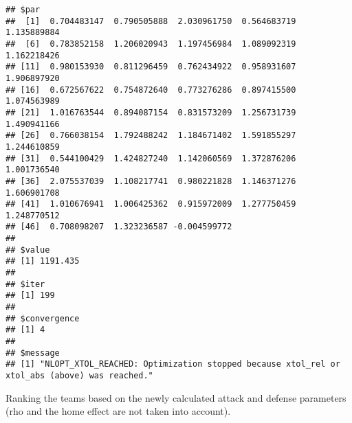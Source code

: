 \documentclass[
]{article}
\newenvironment{Shaded}{\begin{snugshade}}{\end{snugshade}}
\newcommand{\AttributeTok}[1]{\textcolor[rgb]{0.77,0.63,0.00}{#1}}
\newcommand{\DecValTok}[1]{\textcolor[rgb]{0.00,0.00,0.81}{#1}}
\newcommand{\FunctionTok}[1]{\textcolor[rgb]{0.00,0.00,0.00}{#1}}
\newcommand{\NormalTok}[1]{#1}
\newcommand{\OtherTok}[1]{\textcolor[rgb]{0.56,0.35,0.01}{#1}}
\newcommand{\SpecialCharTok}[1]{\textcolor[rgb]{0.00,0.00,0.00}{#1}}
\newcommand{\StringTok}[1]{\textcolor[rgb]{0.31,0.60,0.02}{#1}}
\begin{document}
\begin{verbatim}
## $par
##  [1]  0.704483147  0.790505888  2.030961750  0.564683719  1.135889884
##  [6]  0.783852158  1.206020943  1.197456984  1.089092319  1.162218426
## [11]  0.980153930  0.811296459  0.762434922  0.958931607  1.906897920
## [16]  0.672567622  0.754872640  0.773276286  0.897415500  1.074563989
## [21]  1.016763544  0.894087154  0.831573209  1.256731739  1.490941166
## [26]  0.766038154  1.792488242  1.184671402  1.591855297  1.244610859
## [31]  0.544100429  1.424827240  1.142060569  1.372876206  1.001736540
## [36]  2.075537039  1.108217741  0.980221828  1.146371276  1.606901708
## [41]  1.010676941  1.006425362  0.915972009  1.277750459  1.248770512
## [46]  0.708098207  1.323236587 -0.004599772
## 
## $value
## [1] 1191.435
## 
## $iter
## [1] 199
## 
## $convergence
## [1] 4
## 
## $message
## [1] "NLOPT_XTOL_REACHED: Optimization stopped because xtol_rel or xtol_abs (above) was reached."
\end{verbatim}

Ranking the teams based on the newly calculated attack and defense
parameters (rho and the home effect are not taken into account).

\begin{Shaded}
\end{Shaded}
\end{document}
